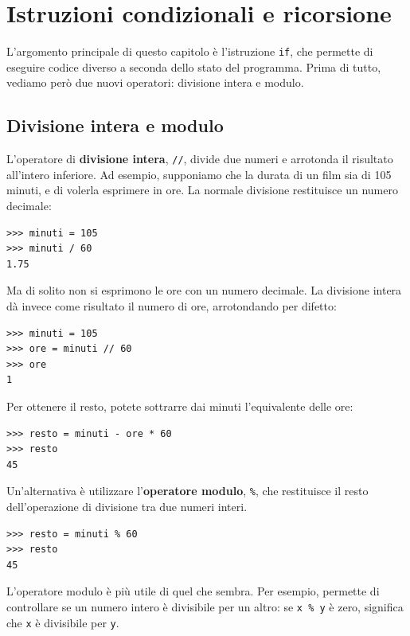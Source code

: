 \documentclass[10pt]{book}
\begin{document}
\chapter{Istruzioni condizionali e ricorsione}

L'argomento principale di questo capitolo è l'istruzione {\tt if}, che permette di eseguire codice diverso a seconda dello stato del programma. Prima di tutto, vediamo però due nuovi operatori: divisione intera e modulo.

\section{Divisione intera e modulo}

L'operatore di {\bf divisione intera}, \verb"//", divide due numeri e arrotonda il risultato all'intero inferiore. Ad esempio, supponiamo che la durata di un film sia di 105 minuti, e di volerla esprimere in ore. La normale divisione  restituisce un numero decimale:

\begin{verbatim}
>>> minuti = 105
>>> minuti / 60
1.75
\end{verbatim}

Ma di solito non si esprimono le ore con un numero decimale. La divisione intera dà invece come risultato il numero di ore, arrotondando per difetto:

\begin{verbatim}
>>> minuti = 105
>>> ore = minuti // 60
>>> ore
1
\end{verbatim}

Per ottenere il resto, potete sottrarre dai minuti l'equivalente delle ore:

\begin{verbatim}
>>> resto = minuti - ore * 60
>>> resto
45
\end{verbatim}


Un'alternativa è utilizzare l'{\bf operatore modulo}, \verb"%", che 
restituisce il resto dell'operazione di divisione tra due numeri interi.

\begin{verbatim}
>>> resto = minuti % 60
>>> resto
45
\end{verbatim}
%

L'operatore modulo è più utile di quel che sembra. Per esempio, permette di controllare se un numero intero è divisibile per un altro: se
{\tt x \% y} è zero, significa che {\tt x} è divisibile per {\tt y}.
\end{document}
